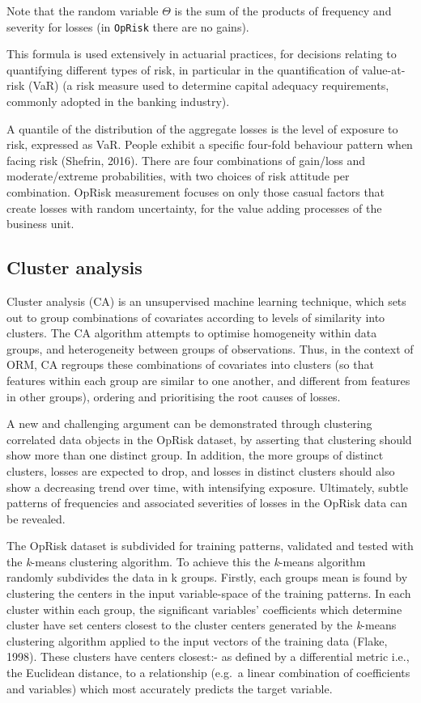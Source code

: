 \documentclass{DissertateUSU}
\begin{document}
Note that the random variable \(\Theta\) is the sum of the products of
frequency and severity for losses (in \texttt{OpRisk} there are no
gains).\medskip

This formula is used extensively in actuarial practices, for decisions
relating to quantifying different types of risk, in particular in the
quantification of value-at-risk (VaR) (a risk measure used to determine
capital adequacy requirements, commonly adopted in the banking
industry).\medskip

A quantile of the distribution of the aggregate losses is the level of
exposure to risk, expressed as VaR. People exhibit a specific four-fold
behaviour pattern when facing risk (Shefrin, 2016). There are four
combinations of gain/loss and moderate/extreme probabilities, with two
choices of risk attitude per combination. OpRisk measurement focuses on
only those casual factors that create losses with random uncertainty,
for the value adding processes of the business unit.

\subsection{Cluster analysis}

Cluster analysis (CA) is an unsupervised machine learning technique,
which sets out to group combinations of covariates according to levels
of similarity into clusters. The CA algorithm attempts to optimise
homogeneity within data groups, and heterogeneity between groups of
observations. Thus, in the context of ORM, CA regroups these
combinations of covariates into clusters (so that features within each
group are similar to one another, and different from features in other
groups), ordering and prioritising the root causes of losses.\medskip

A new and challenging argument can be demonstrated through clustering
correlated data objects in the OpRisk dataset, by asserting that
clustering should show more than one distinct group. In addition, the
more groups of distinct clusters, losses are expected to drop, and
losses in distinct clusters should also show a decreasing trend over
time, with intensifying exposure. Ultimately, subtle patterns of
frequencies and associated severities of losses in the OpRisk data can
be revealed.\medskip  

The OpRisk dataset is subdivided for training patterns, validated and
tested with the \emph{k}-means clustering algorithm. To achieve this the
\emph{k}-means algorithm randomly subdivides the data in k groups.
Firstly, each groups mean is found by clustering the centers in the
input variable-space of the training patterns. In each cluster within
each group, the significant variables' coefficients which determine
cluster have set centers closest to the cluster centers generated by the
\emph{k}-means clustering algorithm applied to the input vectors of the
training data (Flake, 1998). These clusters have centers closest:- as
defined by a differential metric i.e., the Euclidean distance, to a
relationship (e.g.~a linear combination of coefficients and variables)
which most accurately predicts the target variable.
\end{document}
